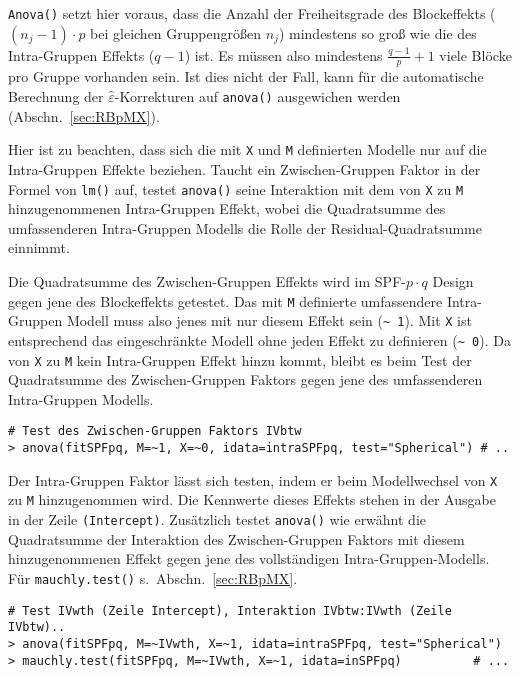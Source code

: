 \lstinline!Anova()! setzt hier voraus, dass die Anzahl der Freiheitsgrade des Blockeffekts ($(n_{j}-1) \cdot p$ bei gleichen Gruppengrößen $n_{j}$) mindestens so groß wie die des Intra-Gruppen Effekts ($q-1$) ist. Es müssen also mindestens $\frac{q-1}{p} + 1$ viele Blöcke pro Gruppe vorhanden sein. Ist dies nicht der Fall, kann für die automatische Berechnung der $\hat{\varepsilon}$-Korrekturen auf \lstinline!anova()! ausgewichen werden (Abschn.\ \ref{sec:RBpMX}).

Hier ist zu beachten, dass sich die mit \lstinline!X! und \lstinline!M! definierten Modelle nur auf die Intra-Gruppen Effekte beziehen. Taucht ein Zwischen-Gruppen Faktor in der Formel von \lstinline!lm()! auf, testet \lstinline!anova()! seine Interaktion mit dem von \lstinline!X! zu \lstinline!M! hinzugenommenen Intra-Gruppen Effekt, wobei die Quadratsumme des umfassenderen Intra-Gruppen Modells die Rolle der Residual-Quadratsumme einnimmt.

Die Quadratsumme des Zwischen-Gruppen Effekts wird im SPF-$p \cdot q$ Design gegen jene des Blockeffekts getestet. Das mit \lstinline!M! definierte umfassendere Intra-Gruppen Modell muss also jenes mit nur diesem Effekt sein (\lstinline!~ 1!). Mit \lstinline!X! ist entsprechend das eingeschränkte Modell ohne jeden Effekt zu definieren (\lstinline!~ 0!). Da von \lstinline!X! zu \lstinline!M! kein Intra-Gruppen Effekt hinzu kommt, bleibt es beim Test der Quadratsumme des Zwischen-Gruppen Faktors gegen jene des umfassenderen Intra-Gruppen Modells.
\begin{lstlisting}
# Test des Zwischen-Gruppen Faktors IVbtw
> anova(fitSPFpq, M=~1, X=~0, idata=intraSPFpq, test="Spherical") # ..
\end{lstlisting}

Der Intra-Gruppen Faktor lässt sich testen, indem er beim Modellwechsel von \lstinline!X! zu \lstinline!M! hinzugenommen wird. Die Kennwerte dieses Effekts stehen in der Ausgabe in der Zeile \lstinline!(Intercept)!. Zusätzlich testet \lstinline!anova()! wie erwähnt die Quadratsumme der Interaktion des Zwischen-Gruppen Faktors mit diesem hinzugenommenen Effekt gegen jene des vollständigen Intra-Gruppen-Modells. Für \lstinline!mauchly.test()! s.\ Abschn.\ \ref{sec:RBpMX}.
\begin{lstlisting}
# Test IVwth (Zeile Intercept), Interaktion IVbtw:IVwth (Zeile IVbtw)..
> anova(fitSPFpq, M=~IVwth, X=~1, idata=intraSPFpq, test="Spherical")
> mauchly.test(fitSPFpq, M=~IVwth, X=~1, idata=inSPFpq)          # ...
\end{lstlisting}

